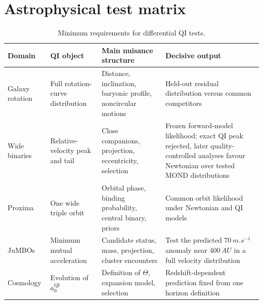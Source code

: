 \documentclass[11pt]{article}
\newcommand{\QI}{\mathrm{QI}}
\begin{document}
\section{Astrophysical test matrix}
\label{app:astro_matrix}

\begin{table}[H]
\centering
\caption{Minimum requirements for differential QI tests.}
\label{tab:astro_matrix}
\begin{tabularx}{\textwidth}{>{\raggedright\arraybackslash}p{}>{\raggedright\arraybackslash}p{}>{\raggedright\arraybackslash}p{}>{\raggedright\arraybackslash}X}
\toprule
Domain & QI object & Main nuisance structure & Decisive output \\
\midrule
Galaxy rotation & Full rotation-curve distribution & Distance, inclination, baryonic profile, noncircular motions & Held-out residual distribution versus common competitors \\
Wide binaries & Relative-velocity peak and tail & Close companions, projection, eccentricity, selection & Frozen forward-model likelihood; exact QI peak rejected, later quality-controlled analyses favour Newtonian over tested MOND distributions \\
Proxima & One wide triple orbit & Orbital phase, binding probability, central binary, priors & Common orbit likelihood under Newtonian and QI models \\
JuMBOs & Minimum mutual acceleration & Candidate status, mass, projection, cluster encounters & Test the predicted \(70\,\si{m.s^{-1}}\) anomaly near \(400\,\si{AU}\) in a full velocity distribution \\
Cosmology & Evolution of \(a_0^{\QI}\) & Definition of \(\Theta\), expansion model, selection & Redshift-dependent prediction fixed from one horizon definition \\
\bottomrule
\end{tabularx}
\end{table}
\end{document}
